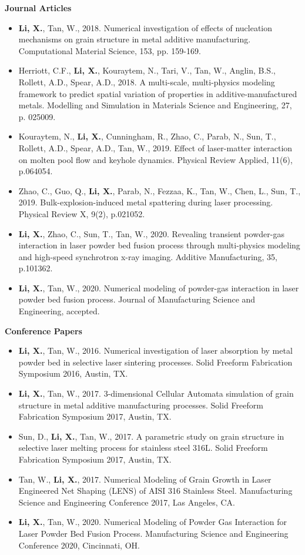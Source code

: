 \documentclass[11pt, letterpaper]{article}
\begin{document}
\textbf{Journal Articles}
\begin{itemize}[leftmargin=*, labelsep=4mm]
   \item \textbf{Li, X.}, Tan, W., 2018. Numerical investigation of effects of nucleation mechanisms
      on grain structure in metal additive manufacturing. Computational Material Science, 153, pp.
      159-169.
   \item Herriott, C.F., \textbf{Li, X.}, Kouraytem, N., Tari, V., Tan, W., Anglin, B.S., Rollett,
      A.D., Spear, A.D., 2018. A multi-scale, multi-physics modeling framework to predict spatial
      variation of properties in additive-manufactured metals. Modelling and Simulation in Materials
      Science and Engineering, 27, p. 025009.
   \item Kouraytem, N., \textbf{Li, X.}, Cunningham, R., Zhao, C., Parab, N., Sun, T., Rollett,
      A.D., Spear, A.D., Tan, W., 2019. Effect of laser-matter interaction on molten pool flow and
      keyhole dynamics. Physical Review Applied, 11(6), p.064054.
   \item Zhao, C., Guo, Q., \textbf{Li, X.}, Parab, N., Fezzaa, K., Tan, W., Chen, L., Sun, T.,
      2019. Bulk-explosion-induced metal spattering during laser processing. Physical Review X,
      9(2), p.021052.
   \item \textbf{Li, X.}, Zhao, C., Sun, T., Tan, W., 2020. Revealing transient powder-gas
      interaction in laser powder bed fusion process through multi-physics modeling and high-speed
      synchrotron x-ray imaging. Additive Manufacturing, 35, p.101362. 
   \item \textbf{Li, X.}, Tan, W., 2020. Numerical modeling of powder-gas interaction in laser
      powder bed fusion process. Journal of Manufacturing Science and Engineering, accepted.
\end{itemize}
\vspace{3pt}
\textbf{Conference Papers}
\begin{itemize}[leftmargin=*, labelsep=5mm]
   \item \textbf{Li, X.}, Tan, W., 2016. Numerical investigation of laser absorption by metal powder
      bed in selective laser sintering processes. Solid Freeform Fabrication Symposium 2016, Austin,
      TX.
   \item \textbf{Li, X.}, Tan, W., 2017. 3-dimensional Cellular Automata simulation of grain
      structure in metal additive manufacturing processes. Solid Freeform Fabrication Symposium
      2017, Austin, TX.
   \item Sun, D., \textbf{Li, X.}, Tan, W., 2017. A parametric study on grain structure in selective
      laser melting process for stainless steel 316L. Solid Freeform Fabrication Symposium 2017,
      Austin, TX.
   \item Tan, W., \textbf{Li, X.}, 2017. Numerical Modeling of Grain Growth in Laser Engineered Net
      Shaping (LENS) of AISI 316 Stainless Steel. Manufacturing Science and Engineering Conference
      2017, Las Angeles, CA.
   \item \textbf{Li, X.}, Tan, W., 2020. Numerical Modeling of Powder Gas Interaction for Laser
      Powder Bed Fusion Process. Manufacturing Science and Engineering Conference 2020, Cincinnati,
      OH.
\end{itemize}
\end{document}
